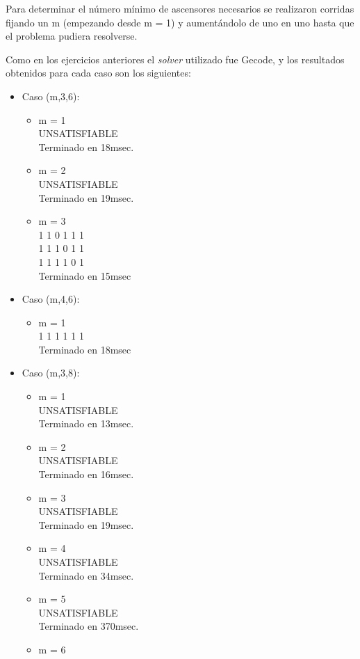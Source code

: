 \documentclass{article}
\begin{document}
Para determinar el número mínimo de ascensores necesarios se realizaron corridas fijando un m (empezando desde m = 1) y aumentándolo de uno en uno hasta que el problema pudiera resolverse.

Como en los ejercicios anteriores el \textit{solver} utilizado fue Gecode, y los resultados obtenidos para cada caso son los siguientes:

\begin{itemize}
\item Caso (m,3,6):
\begin{itemize}
\item m = 1\\
UNSATISFIABLE\\
Terminado en 18msec.
\item m = 2\\
UNSATISFIABLE\\
Terminado en 19msec.
\item m = 3\\
1 1 0 1 1 1 \\
1 1 1 0 1 1 \\
1 1 1 1 0 1 \\
Terminado en 15msec
\end{itemize}
\item Caso (m,4,6):
\begin{itemize}
\item m = 1\\
1 1 1 1 1 1\\
Terminado en 18msec
\end{itemize}
\item Caso (m,3,8):
\begin{itemize}
\item m = 1\\
UNSATISFIABLE\\
Terminado en 13msec.
\item m = 2\\
UNSATISFIABLE\\
Terminado en 16msec.
\item m = 3\\
UNSATISFIABLE\\
Terminado en 19msec.
\item m = 4\\
UNSATISFIABLE\\
Terminado en 34msec.
\item m = 5\\
UNSATISFIABLE\\
Terminado en 370msec.
\item m = 6\\

\end{itemize}
\end{itemize}
\end{document}
